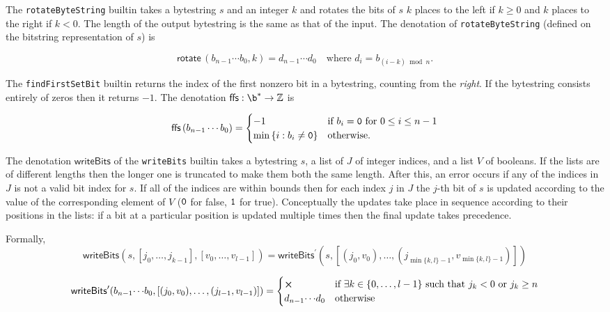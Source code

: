 \label{note:rotate}
The \texttt{rotateByteString} builtin takes a bytestring $s$ and an integer $k$
and rotates the bits of $s$ $k$ places to the left if $k \geq 0$ and $k$ places
to the right if $k < 0$.  The length of the output bytestring is the same as
that of the input.  The denotation of
\texttt{rotateByteString} (defined on the bitstring representation of $s$) is 

$$
\mathsf{rotate}\,(b_{n-1} \cdots b_0, k) = d_{n-1}\cdots d_0 \quad\text{where $d_i = b_{(i-k)\bmod n}$}.
$$

\label{note:ffs}
The \texttt{findFirstSetBit} builtin returns the index of the first nonzero bit
in a bytestring, counting from the \textit{right}. If the bytestring consists
entirely of zeros then it returns $-1$.  The denotation
$\mathsf{ffs}: \b^* \rightarrow \Z$ is

$$
\mathsf{ffs}\,(b_{n-1}\cdots b_0) =
\begin{cases}
  -1 & \text{if $b_i = \mathtt{0}$ for $0 \leq i \leq n-1$}\\
  \min{\{i: b_i \ne \mathtt{0}\}} & \text{otherwise.}
  \end{cases}
$$


\label{note:writebits}
The denotation $\mathsf{writeBits}$ of the \texttt{writeBits} builtin takes a
bytestring $s$, a list of $J$ of integer indices, and a list $V$ of booleans.
If the lists are of different lengths then the longer one is truncated to make
them both the same length.  After this, an error occurs if any of the indices in
$J$ is not a valid bit index for $s$.  If all of the indices are within bounds
then for each index $j$ in $J$ the $j$-th bit of $s$ is updated according to the
value of the corresponding element of $V$ ($\mathtt{0}$
for \textsf{false}, $\mathtt{1}$ for \textsf{true}).  Conceptually the updates
take place in sequence according to their positions in the lists: if a bit at a
particular position is updated multiple times then the final update takes
precedence.

\smallskip
\noindent Formally, 
$$
\mathsf{writeBits}(s, [j_0 , \ldots, j_{k-1}], [v_0, \ldots, v_{l-1}]) =
    \mathsf{writeBits}^{\prime} (s, [(j_0, v_0) , \ldots, (j_{\min\{k,l\}-1}, v_{\min\{k,l\}-1})])
$$

$$
\mathsf{writeBits}^{\prime}(b_{n-1}{\cdots}b_0, [(j_0,v_0), \ldots, (j_{l-1}, v_{l-1})]) = 
\begin{cases}
\errorX & \text{if $\exists k \in \{0, \ldots, l-1\}$ such that $j_k<0$ or $j_k \geq n$} \\
d_{n-1}{\cdots}d_0 & \text{otherwise}
\end{cases}
$$

